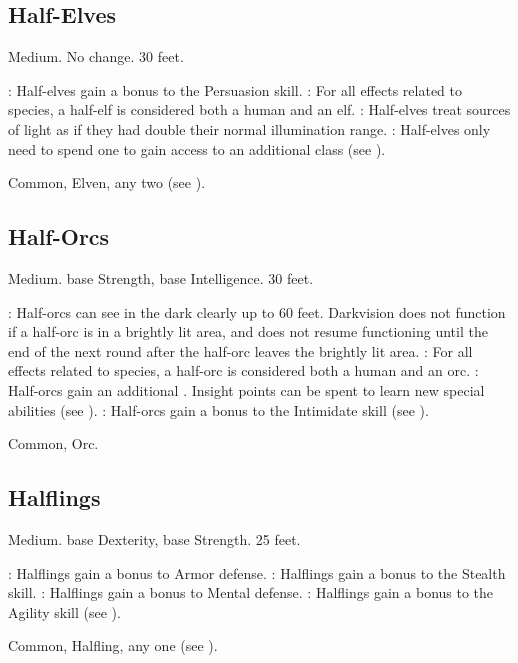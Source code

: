 \subsection{Half-Elves}\label{Half-Elves}
 Medium.
 No change.
 30 feet.
\begin{itemize}
    : Half-elves gain a  bonus to the Persuasion skill.
    : For all effects related to species, a half-elf is considered both a human and an elf.
    : Half-elves treat sources of light as if they had double their normal illumination range.
    : Half-elves only need to spend one  to gain access to an additional class (see ).
\end{itemize}
 Common, Elven, any two  (see ).

\subsection{Half-Orcs}
 Medium.
  base Strength,  base Intelligence.
 30 feet.
\begin{itemize}
    : Half-orcs can see in the dark clearly up to 60 feet. Darkvision does not function if a half-orc is in a brightly lit area, and does not resume functioning until the end of the next round after the half-orc leaves the brightly lit area.
    : For all effects related to species, a half-orc is considered both a human and an orc.
    : Half-orcs gain an additional .
        Insight points can be spent to learn new special abilities (see ).
    : Half-orcs gain a  bonus to the Intimidate skill (see ).
\end{itemize}
 Common, Orc.

\subsection{Halflings}
 Medium.
  base Dexterity,  base Strength.
 25 feet.
\begin{itemize}
    : Halflings gain a  bonus to Armor defense.
    : Halflings gain a  bonus to the Stealth skill.
    : Halflings gain a  bonus to Mental defense.
    : Halflings gain a  bonus to the Agility skill (see ).
\end{itemize}
 Common, Halfling, any one  (see ).

